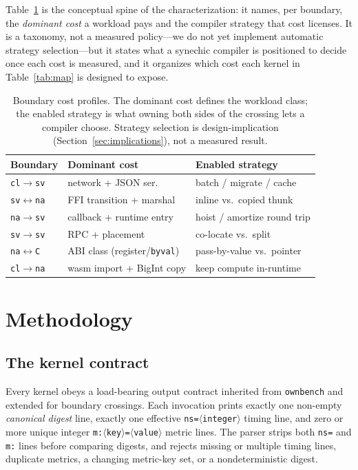 \documentclass[conference]{IEEEtran}
\newcommand{\code}[1]{\texttt{#1}}
\begin{document}
Table~\ref{tab:profiles} is the conceptual spine of the characterization: it
names, per boundary, the \emph{dominant cost} a workload pays and the compiler
strategy that cost licenses. It is a taxonomy, not a measured policy---we do not
yet implement automatic strategy selection---but it states what a synechic
compiler is positioned to decide once each cost is measured, and it organizes
which cost each kernel in Table~\ref{tab:map} is designed to expose.

\begin{table}[t]
\caption{Boundary cost profiles. The dominant cost defines the workload class;
the enabled strategy is what owning both sides of the crossing lets a compiler
choose. Strategy selection is design-implication (Section~\ref{sec:implications}),
not a measured result.}
\label{tab:profiles}
\centering
\small
\begin{tabular}{@{}lll@{}}
\toprule
Boundary & Dominant cost & Enabled strategy \\
\midrule
\code{cl}$\rightarrow$\code{sv} & network + JSON ser. & batch / migrate / cache \\
\code{sv}$\leftrightarrow$\code{na} & FFI transition + marshal & inline vs.\ copied thunk \\
\code{na}$\rightarrow$\code{sv} & callback + runtime entry & hoist / amortize round trip \\
\code{sv}$\rightarrow$\code{sv} & RPC + placement & co-locate vs.\ split \\
\code{na}$\leftrightarrow$\code{C} & ABI class (register/\code{byval}) & pass-by-value vs.\ pointer \\
\code{cl}$\rightarrow$\code{na} & wasm import + BigInt copy & keep compute in-runtime \\
\bottomrule
\end{tabular}
\end{table}

\section{Methodology}
\label{sec:method}

\subsection{The kernel contract}

Every kernel obeys a load-bearing output contract inherited from \code{ownbench}
and extended for boundary crossings. Each invocation prints exactly one non-empty
\emph{canonical digest} line, exactly one effective \code{ns=$\langle$integer$\rangle$}
timing line, and zero or more unique integer \code{m:$\langle$key$\rangle$=$\langle$value$\rangle$}
metric lines. The parser strips both \code{ns=} and \code{m:} lines before
comparing digests, and rejects missing or multiple timing lines, duplicate
metrics, a changing metric-key set, or a nondeterministic digest.
\end{document}
